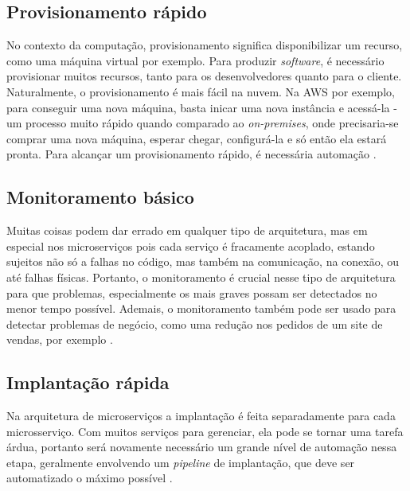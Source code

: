 
\subsection{Provisionamento rápido}\label{boas-praticas-provisionamento-rapido}

No contexto da computação, provisionamento significa disponibilizar um recurso, como uma máquina virtual por exemplo. Para produzir \emph{software}, é necessário provisionar muitos recursos, tanto para os desenvolvedores quanto para o cliente. Naturalmente, o provisionamento é mais fácil na nuvem. Na AWS por exemplo, para conseguir uma nova máquina, basta inicar uma nova instância e acessá-la - um processo muito rápido quando comparado ao \emph{on-premises}, onde precisaria-se comprar uma nova máquina, esperar chegar, configurá-la e só então ela estará pronta. Para alcançar um provisionamento rápido, é necessária automação \cite{martin-fowler-microservice-prereq}.

\subsection{Monitoramento básico}\label{boas-praticas-monitoramento-basico}

Muitas coisas podem dar errado em qualquer tipo de arquitetura, mas em especial nos microserviços pois cada serviço é fracamente acoplado, estando sujeitos não só a falhas no código, mas também na comunicação, na conexão, ou até falhas físicas. Portanto, o monitoramento é crucial nesse tipo de arquitetura para que problemas, especialmente os mais graves possam ser detectados no menor tempo possível. Ademais, o monitoramento também pode ser usado para detectar problemas de negócio, como uma redução nos pedidos de um site de vendas, por exemplo \cite{martin-fowler-microservice-prereq}.

\subsection{Implantação rápida}\label{boas-praticas-implantacao-rapida}

Na arquitetura de microserviços a implantação é feita separadamente para cada microsserviço. Com muitos serviços para gerenciar, ela pode se tornar uma tarefa árdua, portanto será novamente necessário um grande nível de automação nessa etapa, geralmente envolvendo um \emph{pipeline} de implantação, que deve ser automatizado o máximo possível \cite{martin-fowler-microservice-prereq}.

